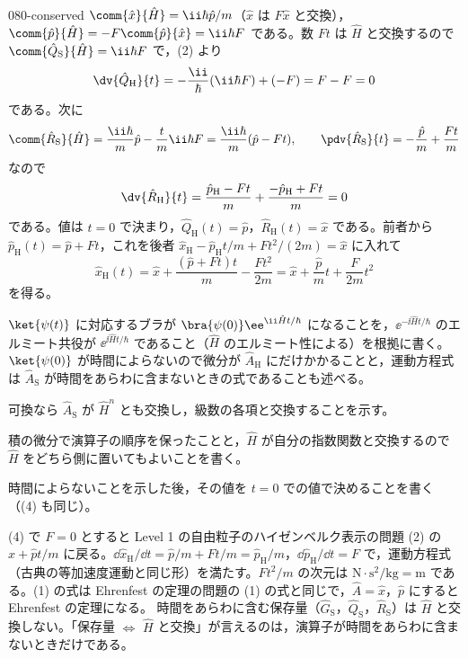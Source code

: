 \documentclass[uplatex,dvipdfmx,a4paper,11pt]{jsarticle}
\begin{document}
\begin{kaisetsu}{080-conserved}
 $\comm{\hat{x}}{\hat{H}}=\ii\hbar\hat{p}/m$（$\hat{x}$ は $F\hat{x}$ と交換），$\comm{\hat{p}}{\hat{H}}=-F\comm{\hat{p}}{\hat{x}}=\ii\hbar F$ である。数 $Ft$ は $\hat{H}$ と交換するので $\comm{\hat{Q}_{\mathrm{S}}}{\hat{H}}=\ii\hbar F$ で，(2) より
\[ \dv{\hat{Q}_{\mathrm{H}}}{t}=-\frac{\ii}{\hbar}(\ii\hbar F)+(-F)=F-F=0 \]
である。次に
\[ \comm{\hat{R}_{\mathrm{S}}}{\hat{H}}=\frac{\ii\hbar}{m}\hat{p}-\frac{t}{m}\ii\hbar F=\frac{\ii\hbar}{m}(\hat{p}-Ft),\qquad \pdv{\hat{R}_{\mathrm{S}}}{t}=-\frac{\hat{p}}{m}+\frac{Ft}{m} \]
なので
\[ \dv{\hat{R}_{\mathrm{H}}}{t}=\frac{\hat{p}_{\mathrm{H}}-Ft}{m}+\frac{-\hat{p}_{\mathrm{H}}+Ft}{m}=0 \]
である。値は $t=0$ で決まり，$\hat{Q}_{\mathrm{H}}(t)=\hat{p}$，$\hat{R}_{\mathrm{H}}(t)=\hat{x}$ である。前者から $\hat{p}_{\mathrm{H}}(t)=\hat{p}+Ft$，これを後者 $\hat{x}_{\mathrm{H}}-\hat{p}_{\mathrm{H}}t/m+Ft^{2}/(2m)=\hat{x}$ に入れて
\[ \hat{x}_{\mathrm{H}}(t)=\hat{x}+\frac{(\hat{p}+Ft)t}{m}-\frac{Ft^{2}}{2m}=\hat{x}+\frac{\hat{p}}{m}t+\frac{F}{2m}t^{2} \]
を得る。
\begin{ronten}
  \item {} $\ket{\psi(t)}$ に対応するブラが $\bra{\psi(0)}\ee^{\ii\hat{H}t/\hbar}$ になることを，$\ee^{-\ii\hat{H}t/\hbar}$ のエルミート共役が $\ee^{\ii\hat{H}t/\hbar}$ であること（$\hat{H}$ のエルミート性による）を根拠に書く。$\ket{\psi(0)}$ が時間によらないので微分が $\hat{A}_{\mathrm{H}}$ にだけかかることと，運動方程式は $\hat{A}_{\mathrm{S}}$ が時間をあらわに含まないときの式であることも述べる。
  \item {} 可換なら $\hat{A}_{\mathrm{S}}$ が $\hat{H}^{n}$ とも交換し，級数の各項と交換することを示す。
  \item {} 積の微分で演算子の順序を保ったことと，$\hat{H}$ が自分の指数関数と交換するので $\hat{H}$ をどちら側に置いてもよいことを書く。
  \item {} 時間によらないことを示した後，その値を $t=0$ での値で決めることを書く（(4) も同じ）。
\end{ronten}
\kenzan (4) で $F=0$ とすると Level 1 の自由粒子のハイゼンベルク表示の問題 (2) の $\hat{x}+\hat{p}t/m$ に戻る。$\dd\hat{x}_{\mathrm{H}}/\dd t=\hat{p}/m+Ft/m=\hat{p}_{\mathrm{H}}/m$，$\dd\hat{p}_{\mathrm{H}}/\dd t=F$ で，運動方程式（古典の等加速度運動と同じ形）を満たす。$Ft^{2}/m$ の次元は $\unit{\newton}\cdot\unit{\second\squared}/\unit{\kilogram}=\unit{\metre}$ である。(1) の式は Ehrenfest の定理の問題の (1) の式と同じで，$\hat{A}=\hat{x}$，$\hat{p}$ にすると Ehrenfest の定理になる。
\tsumazuki 時間をあらわに含む保存量（$\hat{G}_{\mathrm{S}}$，$\hat{Q}_{\mathrm{S}}$，$\hat{R}_{\mathrm{S}}$）は $\hat{H}$ と交換しない。「保存量 $\Leftrightarrow$ $\hat{H}$ と交換」が言えるのは，演算子が時間をあらわに含まないときだけである。
\end{kaisetsu}
\end{document}
